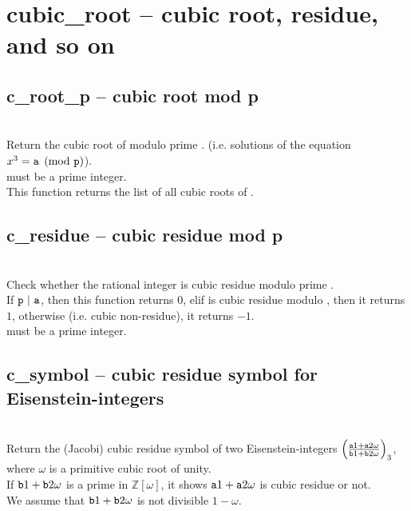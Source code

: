 

 \section{cubic\_root -- cubic root, residue, and so on}
%
  \subsection{c\_root\_p -- cubic root mod p}
   \\
   \spacing
   \quad Return the cubic root of  modulo prime . (i.e. solutions of the equation $x^3 = {\texttt a} \pmod{{\texttt p}}$).\\
   \spacing
   \quad {} must be a prime integer.\\
   This function returns the list of all cubic roots of .\\
%
  \subsection{c\_residue -- cubic residue mod p}
   \\
   \spacing
   \quad Check whether the rational integer  is cubic residue modulo prime .\\
   \spacing
   \quad If ${\texttt p}\ |\ {\texttt a}$, then this function returns $0$,
   elif  is cubic residue modulo , then it returns $1$,
   otherwise (i.e. cubic non-residue), it returns $-1$.\\
   \spacing
   \quad {} must be a prime integer.\\
%
  \subsection{c\_symbol -- cubic residue symbol for Eisenstein-integers}
   \\
   \spacing
   \quad Return the (Jacobi) cubic residue symbol of two Eisenstein-integers $\left(\frac{{\texttt a1}+{\texttt a2}\omega}{{\texttt b1}+{\texttt b2}\omega}\right)_3$,
where $\omega$ is a primitive cubic root of unity.\\
   \spacing
   If ${\texttt b1}+{\texttt b2}\omega$ is a prime in $\mathbb{Z}[\omega]$, it shows ${\texttt a1}+{\texttt a2}\omega$ is cubic residue or not.\\
   \spacing
   \quad We assume that ${\texttt b1}+{\texttt b2}\omega$ is not divisible $1-\omega$.\\
%
